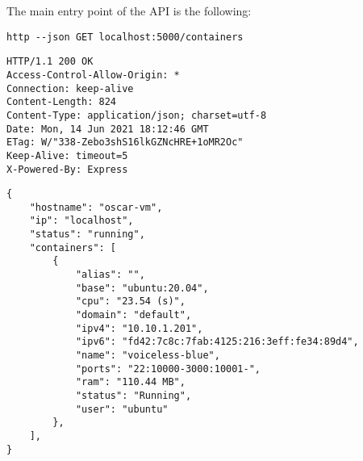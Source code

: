 
The main entry point of the API is the following:
\begin{verbatim}
http --json GET localhost:5000/containers
\end{verbatim}
\begin{verbatim}
HTTP/1.1 200 OK
Access-Control-Allow-Origin: *
Connection: keep-alive
Content-Length: 824
Content-Type: application/json; charset=utf-8
Date: Mon, 14 Jun 2021 18:12:46 GMT
ETag: W/"338-Zebo3shS16lkGZNcHRE+1oMR2Oc"
Keep-Alive: timeout=5
X-Powered-By: Express
\end{verbatim}
\begin{verbatim}
{
    "hostname": "oscar-vm",
    "ip": "localhost",
    "status": "running",
    "containers": [
        {
            "alias": "",
            "base": "ubuntu:20.04",
            "cpu": "23.54 (s)",
            "domain": "default",
            "ipv4": "10.10.1.201",
            "ipv6": "fd42:7c8c:7fab:4125:216:3eff:fe34:89d4",
            "name": "voiceless-blue",
            "ports": "22:10000-3000:10001-",
            "ram": "110.44 MB",
            "status": "Running",
            "user": "ubuntu"
        },
    ],
}
\end{verbatim}
